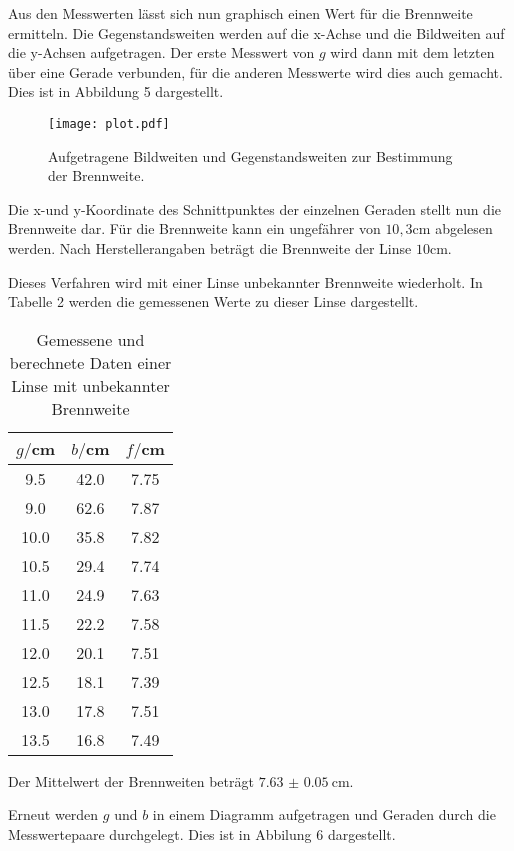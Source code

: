 Aus den Messwerten lässt sich nun graphisch einen Wert für die Brennweite ermitteln. Die Gegenstandsweiten
werden auf die x-Achse und die Bildweiten auf die y-Achsen aufgetragen. Der erste Messwert von $g$ wird dann mit
dem letzten über eine Gerade verbunden, für die anderen Messwerte wird dies auch gemacht. Dies ist in
Abbildung 5 dargestellt.




\begin{figure}
  \centering
  \texttt{[image: plot.pdf]}
  \caption{Aufgetragene Bildweiten und Gegenstandsweiten zur Bestimmung der Brennweite.}
  \label{fig:plot}
\end{figure}


Die x-und y-Koordinate des Schnittpunktes der einzelnen Geraden stellt nun die Brennweite dar. Für die Brennweite kann
ein ungefährer von $10,3$cm abgelesen werden. Nach Herstellerangaben beträgt die Brennweite der Linse $10$cm.



Dieses Verfahren wird mit einer Linse unbekannter Brennweite wiederholt. In Tabelle 2 werden
die gemessenen Werte zu dieser Linse dargestellt.

\begin{table}[H]
  \centering
  \caption{Gemessene und berechnete Daten einer Linse mit unbekannter Brennweite}
  \label{tab:Widerstand}
  \begin{tabular}{c c c}
    \toprule
    $g/$cm  & $b/$cm & $f/$cm \\
    \midrule
    9.5     &     42.0 & 7.75 \\
    9.0     &     62.6 & 7.87 \\
    10.0    &     35.8 & 7.82 \\
    10.5    &     29.4 & 7.74 \\
    11.0    &     24.9 & 7.63 \\
    11.5    &     22.2 & 7.58 \\
    12.0    &     20.1 & 7.51 \\
    12.5    &     18.1 & 7.39 \\
    13.0    &     17.8 & 7.51 \\
    13.5    &     16.8 & 7.49 \\
    \bottomrule
  \end{tabular}
\end{table}

Der Mittelwert der Brennweiten beträgt $\SI{7.63(5)}{\centi\meter}$.

Erneut werden $g$ und $b$ in einem Diagramm aufgetragen und Geraden durch die Messwertepaare durchgelegt. Dies ist in Abbilung 6
dargestellt.

